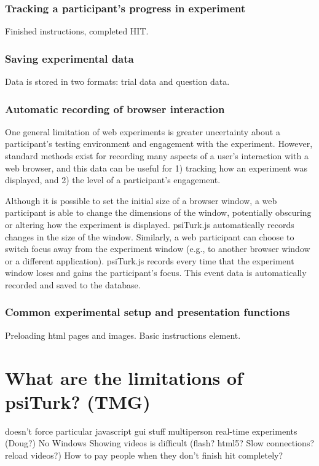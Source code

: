 \documentclass[jou,apacite]{apa6}
\begin{document}
\subsubsection{Tracking a participant's progress in experiment}

Finished instructions, completed HIT.

\subsubsection{Saving experimental data}

Data is stored in two formats: trial data and question data.

\subsubsection{Automatic recording of browser interaction}

One general limitation of web experiments is greater uncertainty about a participant's testing environment and engagement with the experiment.
However, standard methods exist for recording many aspects of a user's interaction with a web browser, and this data can be useful for 1) tracking how an experiment was displayed, and 2) the level of a participant's engagement.

Although it is possible to set the initial size of a browser window, a web participant is able to change the dimensions of the window, potentially obscuring or altering how the experiment is displayed.
psiTurk.js automatically records changes in the size of the window.
Similarly, a web participant can choose to switch focus away from the experiment window (e.g., to another browser window or a different application).
psiTurk.js records every time that the experiment window loses and gains the participant's focus.
This event data is automatically recorded and saved to the database.


\subsubsection{Common experimental setup and presentation functions}

Preloading html pages and images. Basic instructions element.


\section{What are the limitations of psiTurk? (TMG)}
doesn't force particular javascript gui stuff
multiperson real-time experiments (Doug?) 
No Windows
Showing videos is difficult (flash? html5? Slow connections? reload videos?)
How to pay people when they don't finish hit completely?
\end{document}
